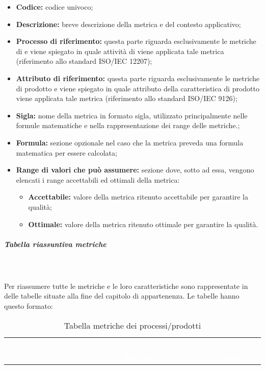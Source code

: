 \begin{itemize}
    \item \textbf{Codice:} codice univoco;
    \item \textbf{Descrizione:} breve descrizione della metrica e del contesto applicativo;
    \item \textbf{Processo di riferimento:} questa parte riguarda esclusivamente le metriche di  e viene spiegato in quale attività di  viene applicata tale metrica (riferimento allo standard ISO/IEC 12207);
    \item \textbf{Attributo di riferimento:} questa parte riguarda esclusivamente le metriche di prodotto e viene spiegato in quale attributo della caratteristica di prodotto viene applicata tale metrica (riferimento allo standard ISO/IEC 9126);
    \item \textbf{Sigla:} nome della metrica in formato sigla, utilizzato principalmente nelle formule matematiche e nella rappresentazione dei range delle metriche.;
    \item \textbf{Formula:} sezione opzionale nel caso che la metrica preveda una formula matematica per essere calcolata;
    \item \textbf{Range di valori che può assumere:} sezione dove, sotto ad essa, vengono elencati i range accettabili ed ottimali della metrica:
    \begin{itemize}
        \item \textbf{Accettabile:} valore della metrica ritenuto accettabile per garantire la qualità;
        \item \textbf{Ottimale:} valore della metrica ritenuto ottimale per garantire la qualità.
    \end{itemize}
\end{itemize} 

\subparagraph{Tabella riassuntiva metriche}\mbox{}\\ \\
Per riassumere tutte le metriche e le loro caratteristiche sono rappresentate in delle tabelle situate alla fine del capitolo di appartenenza. Le tabelle hanno questo formato:

{
\renewcommand{\arraystretch}{1.5}
\begin{longtable}{ c C{4cm} c c c}
\caption{Tabella metriche dei processi/prodotti}\\
\textcolor{white}{\textbf{Metrica}} & \textcolor{white}{\textbf{Nome}} & \textcolor{white}{\textbf{Sigla}} & \textcolor{white}{\textbf{Valore Accettabile}} & \textcolor{white}{\textbf{Valore Ottimale}}\\
\end{longtable}
}

